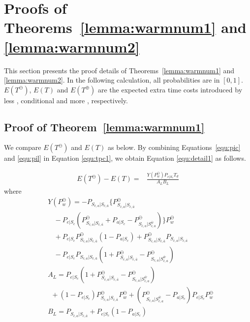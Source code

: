 \newpage
\section{Proofs of Theorems~\ref{lemma:warmnum1} and \ref{lemma:warmnum2}}
\label{appendixa}
This section presents the proof details of Theorems~\ref{lemma:warmnum1} and \ref{lemma:warmnum2}.
In the following calculation,
 all probabilities are in $[0,1]$.
$E(T^{\ominus})$, $E(T)$ and $E(T^{\oplus})$ are the expected extra time costs
    introduced by less {\vwarm}, conditional {\vwarm} and more {\vwarm}, respectively.

\subsection{Proof of Theorem~\ref{lemma:warmnum1}}
\label{appendixa1}
We compare $E(T^{\ominus})$ and  $E(T)$ as below.
By combining Equations~\ref{equ:pic} and \ref{equ:pil} in Equation \ref{equ:tpc1},
we obtain Equation \ref{equ:detail1} as follows.

\begin{equation}
\label{equ:detail1}
\begin{split}
E(T^{\ominus}) - E(T) = &\frac{Y(P_{w}^{\ominus})P_{e|S_{c}}T_{d}}{A_{L} B_{L}}
\end{split}\end{equation}
where
\begin{equation*}
\label{equ:ypwarm1}
\begin{split}
&Y(P_{w}^{\ominus}) = -P_{S_{\bar{c}, a}|S_{\bar{c},\bar{a}}}\{P_{S_{\bar{c}, a}|S_{\bar{c},\bar{a}}}^{\ominus} \\
&\ \ \ \ -P_{e|S_{c}}(P_{S_{\bar{c}, a}|S_{\bar{c},\bar{a}}}^{\ominus}+P_{a|S_{c}}-P_{S_{\bar{c}, a}|S_{\bar{c},a}^{\bar{w}}}^{\ominus})\} P_{w}^{\ominus} \\
&\ \ \ \  +  P_{e|S_{c}}P_{S_{\bar{c}, a}|S_{\bar{c},\bar{a}}}^{\ominus}(1-P_{a|S_{c}})+P_{S_{\bar{c}, a}|S_{\bar{c},\bar{a}}}^{\ominus}P_{S_{\bar{c}, a}|S_{\bar{c},\bar{a}}}\\
&\ \ \ \  - P_{e|S_{c}}P_{S_{\bar{c}, a}|S_{\bar{c},\bar{a}}}(1+P_{S_{\bar{c}, a}|S_{\bar{c},\bar{a}}}^{\ominus}-P_{S_{\bar{c}, a}|S_{\bar{c},a}^{\bar{w}}}^{\ominus}) \, \\
&A_{L}=P_{e|S_{c}}(1+P_{S_{\bar{c}, a}|S_{\bar{c},\bar{a}}}^{\ominus}-P_{S_{\bar{c}, a}|S_{\bar{c},a}^{\bar{w}}}^{\ominus})\\
&\ \ +(1-P_{e|S_{c}})P_{S_{\bar{c}, a}|S_{\bar{c},\bar{a}}}^{\ominus}P_{w}^{\ominus}+(P_{S_{\bar{c}, a}|S_{\bar{c},a}^{\bar{w}}}^{\ominus}-P_{a|S_{c}})P_{e|S_{c}}P_{w}^{\ominus} \\
&B_{L}=P_{S_{\bar{c}, a}|S_{\bar{c},\bar{a}}}+P_{e|S_{c}}(1-P_{a|S_{c}})
\end{split}
\end{equation*}

